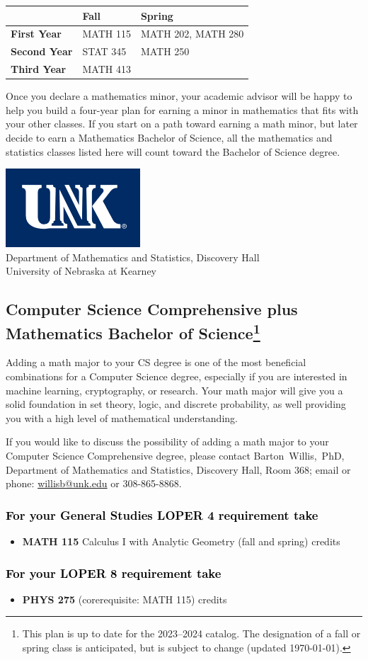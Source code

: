 \documentclass[10pt]{article}
\makeatletter
\newcommand{\calcone}{\textbf{MATH 115} Calculus I with Analytic Geometry (fall and spring) \dotfill 5 credits}
\newcommand{\calconeshort}{MATH 115}
\newcommand{\calctwoshort}{MATH 202}
\newcommand{\foundationsshort}{MATH 250}
\newcommand{\linearshort}{MATH 280}
\newcommand{\discreteshort}{MATH 413}
\newcommand{\appliedstatshort}{STAT 345}
\newcommand{\physics}{\textbf{PHYS 275}  (corerequisite: \calconeshort) \dotfill 3 credits}
\newcommand{\contactbw}{\mbox{Barton Willis, PhD}, Department of Mathematics and Statistics,  Discovery Hall, Room 368;
email or phone: \href{mailto:willisb@unk.edu}{willisb@unk.edu} or 308-865-8868.}
\newcommand{\forinfo}[2]{If you would like to discuss the possibility of adding a math {#1} to your {#2}, please contact \contactbw}
\newcommand{\catalog}{2023--2024 }
\newcommand{\LOPER}{LOPER\xspace}
\newcommand{\myfootnote}{\footnote{This plan is up to date for  the \catalog catalog. The designation of a fall or spring class is 
anticipated, but  is subject to change (updated \today).}}
\newcommand{\myheading}{
\begin{flushleft}
\includegraphics[scale=0.35]{unk-logo}\\
\setcounter{footnote}{0}
\vspace{0.25in}
 \textcolor{unkblue}{Department of Mathematics and Statistics, Discovery Hall} \\
  \textcolor{unkblue}{University of Nebraska at Kearney}
\end{flushleft}}
\newcommand{\mathminor}{
  \begin{center}
   \begin{tabular}[h]{| l | l | l|} 
      \hline
      & \textbf{Fall}         &  \textbf{Spring}  \\ \hline 
      \textbf{First Year} & \calconeshort & \calctwoshort, \linearshort \\  \hline
      \textbf{Second Year} &  \appliedstatshort{} &  \foundationsshort \\ \hline
      \textbf{Third Year} &    \discreteshort              &  \\ \hline
      \end{tabular}
      \end{center}}
\makeatother
\begin{document}
\begin{center}
\mathminor
\end{center}


 \vspace{0.1in}
\noindent Once you declare a mathematics minor, your academic advisor will be happy to help you build a 
four-year plan for earning a minor in mathematics that fits with 
your other classes.  If you start on a path toward earning a math minor, but later decide to 
earn a  Mathematics Bachelor of 
Science, all the mathematics and statistics  classes listed here 
will count toward the Bachelor of Science degree.


\newpage

\myheading



\vspace{-0.1in}
\subsection*{\textbf{\textcolor{unkblue}{Computer Science Comprehensive plus Mathematics Bachelor of Science\myfootnote}}}

Adding a math major to your CS degree is one of the most beneficial combinations for 
a Computer Science degree, especially if you are interested in machine learning, 
cryptography,   or research.  Your math major  will give you a solid foundation 
in set theory, logic, and discrete probability, 
as well providing you with a high level of mathematical understanding. 



\forinfo{major}{Computer Science Comprehensive degree}


\subsubsection*{\textcolor{black}{For your General Studies \LOPER 4 requirement take}}
\begin{itemize}
\item \calcone
\end{itemize}

\subsubsection*{\textcolor{black}{For your \LOPER 8 requirement take}}

\begin{itemize}
   \item \physics 
\end{itemize}
\end{document}
